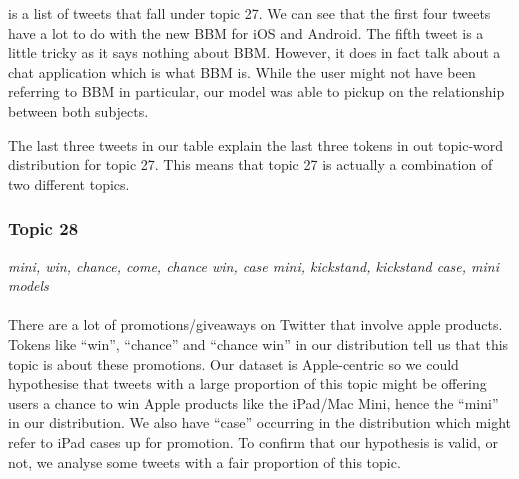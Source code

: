  is a list of tweets that fall under topic 27. We can see that the
first four tweets have a lot to do with the new BBM for iOS and Android. The fifth tweet is a little
tricky as it says nothing about BBM\@. However, it does in fact talk about a chat application which is
what BBM is. While the user might not have been referring to BBM in particular, our model was able
to pickup on the relationship between both subjects.

The last three tweets in our table explain the last three tokens in out topic-word distribution for
topic 27. This means that topic 27 is actually a combination of two different topics.



\subsubsection{Topic 28}
\label{sec:topic-28}
\textit{mini, win, chance, come, chance win, case mini, kickstand, kickstand case, mini models}\\\\
There are a lot of promotions/giveaways on Twitter that involve apple products. Tokens like
``win'', ``chance'' and ``chance win''  in our distribution tell us that this topic is about these
promotions. Our dataset is Apple-centric so we could hypothesise that tweets with a large proportion
of this topic might be offering users a chance to win Apple products like the iPad/Mac Mini, hence
the ``mini'' in our distribution. We also have ``case'' occurring in the distribution which might
refer to iPad cases up for promotion. To confirm that our hypothesis is valid, or not, we
analyse some tweets with a fair proportion of this topic.


